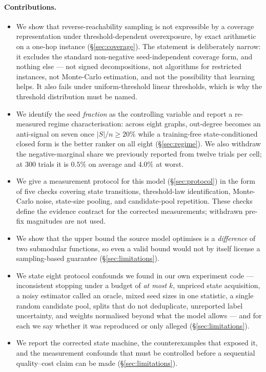 \paragraph{Contributions.}
\begin{itemize}
  \item We show that reverse-reachability sampling is not expressible by a coverage representation
        under threshold-dependent overexposure, by exact arithmetic on a one-hop instance
        (\S\ref{sec:coverage}). The statement is deliberately narrow: it excludes the standard
        non-negative seed-independent coverage form, and nothing else --- not signed
        decompositions, not algorithms for restricted instances, not Monte-Carlo estimation, and
        not the possibility that learning helps. It also fails under uniform-threshold linear
        thresholds, which is why the threshold distribution must be named.
  \item We identify the seed \emph{fraction} as the controlling variable and report a re-measured
        regime characterisation: across eight graphs, out-degree becomes an anti-signal on seven
        once $|S|/n \ge 20\%$ while a training-free state-conditioned closed form is the better
        ranker on all eight (\S\ref{sec:regime}). We also withdraw the negative-marginal share we
        previously reported from twelve trials per cell; at $300$ trials it is $0.5\%$ on average
        and $4.0\%$ at worst.
  \item We give a measurement protocol for this model (\S\ref{sec:protocol}) in the form of five
        checks covering state transitions, threshold-law identification, Monte-Carlo noise,
        state-size pooling, and candidate-pool repetition. These checks define the evidence
        contract for the corrected measurements; withdrawn pre-fix magnitudes are not used.
  \item We show that the upper bound the source model optimises is a \emph{difference} of two
        submodular functions, so even a valid bound would not by itself license a sampling-based
        guarantee (\S\ref{sec:limitations}).
  \item We state eight protocol confounds we found in our own experiment code --- inconsistent
        stopping under a budget of \emph{at most} $k$, unpriced state acquisition, a noisy estimator
        called an oracle, mixed seed sizes in one statistic, a single random candidate pool, splits
        that do not deduplicate, unreported label uncertainty, and weights normalised beyond what
        the model allows --- and for each we say whether it was reproduced or only alleged
        (\S\ref{sec:limitations}).
  \item We report the corrected state machine, the counterexamples that exposed it, and the
        measurement confounds that must be controlled before a sequential quality--cost claim can
        be made (\S\ref{sec:limitations}).
\end{itemize}

